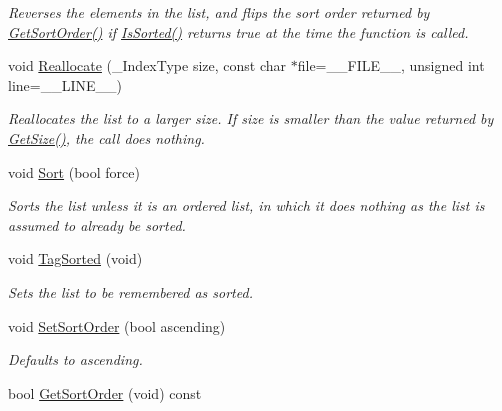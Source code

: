 \begin{DoxyCompactItemize}
\begin{DoxyCompactList}\small\item\em Reverses the elements in the list, and flips the sort order returned by \hyperlink{class_data_structures_1_1_multilist_a800048ec6f280da5e7a161a22a43b87b}{Get\-Sort\-Order()} if \hyperlink{class_data_structures_1_1_multilist_aacbab3fd63f299185141b0c4a62e9ef5}{Is\-Sorted()} returns true at the time the function is called. \end{DoxyCompactList}\item 
\hypertarget{class_data_structures_1_1_multilist_a15148dd58d303f1f6d72ecf5d1663aea}{void \hyperlink{class_data_structures_1_1_multilist_a15148dd58d303f1f6d72ecf5d1663aea}{Reallocate} (\-\_\-\-Index\-Type size, const char $\ast$file=\-\_\-\-\_\-\-F\-I\-L\-E\-\_\-\-\_\-, unsigned int line=\-\_\-\-\_\-\-L\-I\-N\-E\-\_\-\-\_\-)}\label{class_data_structures_1_1_multilist_a15148dd58d303f1f6d72ecf5d1663aea}

\begin{DoxyCompactList}\small\item\em Reallocates the list to a larger size. If {\itshape size} is smaller than the value returned by \hyperlink{class_data_structures_1_1_multilist_a374ed61cd2124ffd01e0bab732f89e61}{Get\-Size()}, the call does nothing. \end{DoxyCompactList}\item 
void \hyperlink{class_data_structures_1_1_multilist_af7c98eb3dd4a13343695b810c5f6d2c4}{Sort} (bool force)
\begin{DoxyCompactList}\small\item\em Sorts the list unless it is an ordered list, in which it does nothing as the list is assumed to already be sorted. \end{DoxyCompactList}\item 
void \hyperlink{class_data_structures_1_1_multilist_a3d07bd2615004b6903a6ae8387238fa9}{Tag\-Sorted} (void)
\begin{DoxyCompactList}\small\item\em Sets the list to be remembered as sorted. \end{DoxyCompactList}\item 
void \hyperlink{class_data_structures_1_1_multilist_a219bfa477ce7722e32462e97c6876634}{Set\-Sort\-Order} (bool ascending)
\begin{DoxyCompactList}\small\item\em Defaults to ascending. \end{DoxyCompactList}\item 
\hypertarget{class_data_structures_1_1_multilist_a800048ec6f280da5e7a161a22a43b87b}{bool \hyperlink{class_data_structures_1_1_multilist_a800048ec6f280da5e7a161a22a43b87b}{Get\-Sort\-Order} (void) const }\label{class_data_structures_1_1_multilist_a800048ec6f280da5e7a161a22a43b87b}


\end{DoxyCompactItemize}
